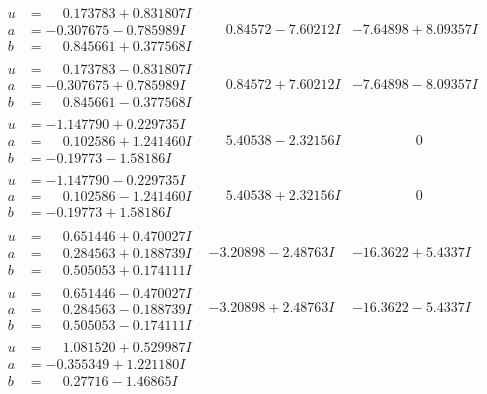 \documentclass[1p]{elsarticle_modified}
\theoremstyle{definition}
\begin{document}
$$\begin{array}{c|c|c}
\begin{aligned}
u &= \phantom{-}0.173783 + 0.831807 I \\
a &= -0.307675 - 0.785989 I \\
b &= \phantom{-}0.845661 + 0.377568 I\end{aligned}
 & \phantom{-}0.84572 - 7.60212 I & -7.64898 + 8.09357 I \\ \hline\begin{aligned}
u &= \phantom{-}0.173783 - 0.831807 I \\
a &= -0.307675 + 0.785989 I \\
b &= \phantom{-}0.845661 - 0.377568 I\end{aligned}
 & \phantom{-}0.84572 + 7.60212 I & -7.64898 - 8.09357 I \\ \hline\begin{aligned}
u &= -1.147790 + 0.229735 I \\
a &= \phantom{-}0.102586 + 1.241460 I \\
b &= -0.19773 - 1.58186 I\end{aligned}
 & \phantom{-}5.40538 - 2.32156 I & \phantom{-0.000000 } 0 \\ \hline\begin{aligned}
u &= -1.147790 - 0.229735 I \\
a &= \phantom{-}0.102586 - 1.241460 I \\
b &= -0.19773 + 1.58186 I\end{aligned}
 & \phantom{-}5.40538 + 2.32156 I & \phantom{-0.000000 } 0 \\ \hline\begin{aligned}
u &= \phantom{-}0.651446 + 0.470027 I \\
a &= \phantom{-}0.284563 + 0.188739 I \\
b &= \phantom{-}0.505053 + 0.174111 I\end{aligned}
 & -3.20898 - 2.48763 I & -16.3622 + 5.4337 I \\ \hline\begin{aligned}
u &= \phantom{-}0.651446 - 0.470027 I \\
a &= \phantom{-}0.284563 - 0.188739 I \\
b &= \phantom{-}0.505053 - 0.174111 I\end{aligned}
 & -3.20898 + 2.48763 I & -16.3622 - 5.4337 I \\ \hline\begin{aligned}
u &= \phantom{-}1.081520 + 0.529987 I \\
a &= -0.355349 + 1.221180 I \\
b &= \phantom{-}0.27716 - 1.46865 I\end{aligned}

\end{array}$$
\end{document}
